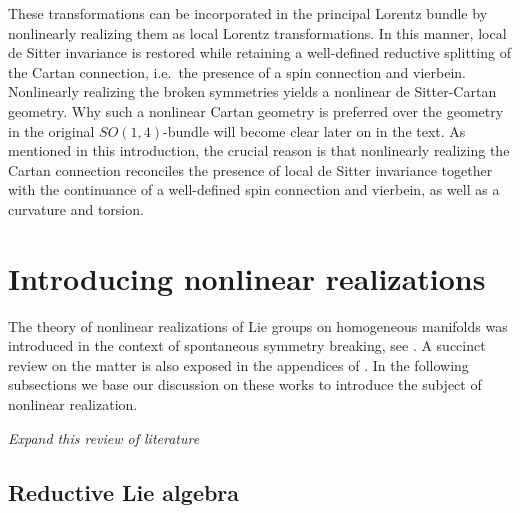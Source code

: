\documentclass[11pt]{article}
\begin{document}
These transformations can be incorporated in the principal 
Lorentz bundle by nonlinearly realizing them as local Lorentz 
transformations. In this manner, local de Sitter invariance is 
restored while retaining a well-defined reductive splitting of 
the Cartan connection, i.e.~the presence of a spin connection and 
vierbein. Nonlinearly realizing the broken symmetries yields a 
nonlinear de Sitter-Cartan geometry.  Why such a nonlinear Cartan 
geometry is preferred over the geometry in the original 
$SO(1,4)$-bundle will become clear later on in the text. As 
mentioned in this introduction, the crucial reason is that 
nonlinearly realizing the Cartan connection reconciles the 
presence of local de Sitter invariance together with the 
continuance of a well-defined spin connection and vierbein, as 
well as a curvature and torsion.



\section{Introducing nonlinear realizations}

The theory of nonlinear realizations of Lie groups on homogeneous 
manifolds was introduced in the context of spontaneous symmetry 
breaking, see \cite{Coleman:1969sm,Callan:1969sn,Volkov:1973vd}.  
A succinct review on the matter is also exposed in the appendices 
of \cite{wess:1992ss}. In the following subsections we base our 
discussion on these works to introduce the subject of nonlinear 
realization.

{\blu\it Expand this review of literature}


\subsection{Reductive Lie algebra}
\end{document}
